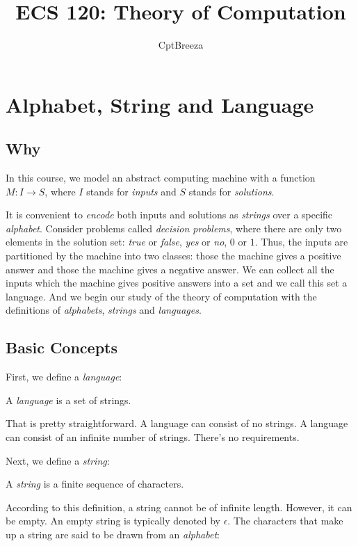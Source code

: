 \documentclass[11pt]{article}
\title{ECS 120: Theory of Computation}
\author{CptBreeza}
\begin{document}
\maketitle

\section{Alphabet, String and Language}

\subsection{Why}

In this course, we model an abstract computing machine with a function
$M : I \rightarrow S$, where $I$ stands for \emph{inputs} and $S$ stands for
\emph{solutions}.

It is convenient to \emph{encode} both inputs and solutions as \emph{strings} over
a specific \emph{alphabet}. Consider problems called \emph{decision problems},
where there are only two elements in the solution set: \emph{true} or
\emph{false}, \emph{yes} or \emph{no}, $0$ or $1$. Thus, the inputs are
partitioned by the machine into two classes: those the machine gives a positive answer and those the machine gives a negative answer. We can collect all the
inputs which the machine gives positive answers into a set and we call this set a
language. And we begin our study of the theory of computation with the
definitions of \emph{alphabets}, \emph{strings} and \emph{languages}.

\subsection{Basic Concepts}

First, we define a \emph{language}:

\begin{definition}
A \emph{language} is a set of strings.
\end{definition}

That is pretty straightforward. A language can consist of no strings. A language can consist of an infinite number of strings. There's no requirements.

Next, we define a \emph{string}:
\begin{definition}
A \emph{string} is a finite sequence of characters.
\end{definition}

According to this definition, a string cannot be of infinite length. However, it can be empty. An empty string is typically denoted by $\epsilon$. The characters that make up a string are said to be drawn from an \emph{alphabet}:
\end{document}
